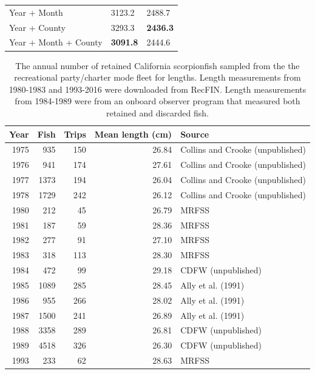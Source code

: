 \documentclass[12pt,]{article}
\begin{document}
\begin{table}[ht]
\begin{tabular}{lll}
  Year + Month & 3123.2 & 2488.7 \\ 
  Year + County & 3293.3 & \textbf{2436.3} \\ 
  Year + Month + County & \textbf{3091.8} & 2444.6 \\ 
   \hline
\end{tabular}
\end{table}\begin{table}[ht]
\centering
\caption{The annual number of retained California scorpionfish 
                                              sampled from the the recreational party/charter 
                                              mode fleet for lengths. Length measurements
                                            from 1980-1983 and 1993-2016 were downloaded from RecFIN.  
                                            Length measurements from 1984-1989 were from an onboard
                                            observer program that measured both retained and discarded
                                            fish.} 
\label{tab:Fleet5_lengthsample}
\begin{tabular}{rrrrl}
  \hline
Year & Fish & Trips & Mean length (cm) & Source \\ 
  \hline
1975 & 935 & 150 & 26.84 & Collins and Crooke (unpublished) \\ 
  1976 & 941 & 174 & 27.61 & Collins and Crooke (unpublished) \\ 
  1977 & 1373 & 194 & 26.04 & Collins and Crooke (unpublished) \\ 
  1978 & 1729 & 242 & 26.12 & Collins and Crooke (unpublished) \\ 
  1980 & 212 &  45 & 26.79 & MRFSS \\ 
  1981 & 187 &  59 & 28.36 & MRFSS \\ 
  1982 & 277 &  91 & 27.10 & MRFSS \\ 
  1983 & 318 & 113 & 28.30 & MRFSS \\ 
  1984 & 472 &  99 & 29.18 & CDFW (unpublished) \\ 
  1985 & 1089 & 285 & 28.45 & Ally et al. (1991) \\ 
  1986 & 955 & 266 & 28.02 & Ally et al. (1991) \\ 
  1987 & 1500 & 241 & 26.89 & Ally et al. (1991) \\ 
  1988 & 3358 & 289 & 26.81 & CDFW (unpublished) \\ 
  1989 & 4518 & 326 & 26.30 & CDFW (unpublished) \\ 
  1993 & 233 &  62 & 28.63 & MRFSS \\ 

\end{tabular}
\end{table}
\end{document}
